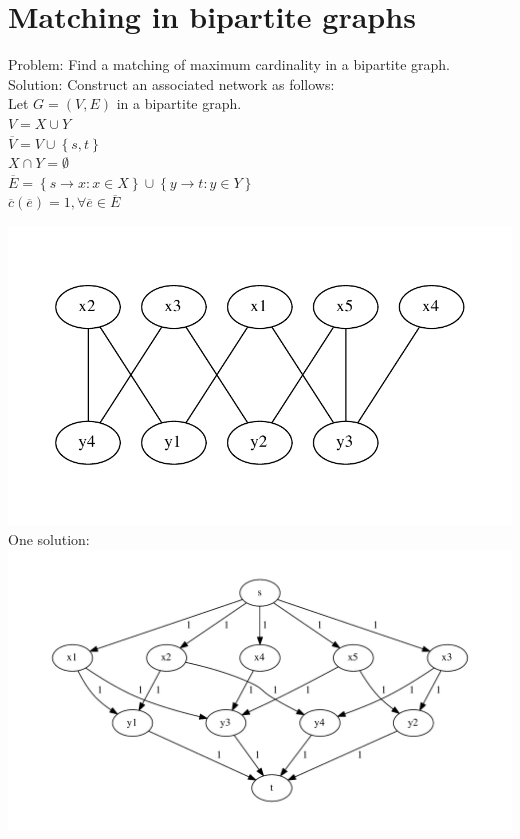 \section{Matching in bipartite graphs}
Problem: Find a matching of maximum cardinality in a bipartite graph.\\
Solution: Construct an associated network as follows:\\
Let $G=(V,E)$ in a bipartite graph.\\ $V = X \cup Y$\\$\overline{V}=V \cup \left\{s,t\right\}$\\
$X\cap Y=\emptyset$\\$\overline{E}=\left\{s \rightarrow x: x \in X \right\}\cup \left\{ y \rightarrow t: y \in Y \right\}$\\
$\overline{c}(\overline{e})=1, \forall \overline{e} \in \overline{E}$
\begin{example*}
\includegraphics[scale=0.6]{diagrams/Chapter4_Example2.pdf}\\
One solution:\\
\includegraphics[scale=0.6]{diagrams/Chapter4_Example3.pdf}\\
\end{example*}
